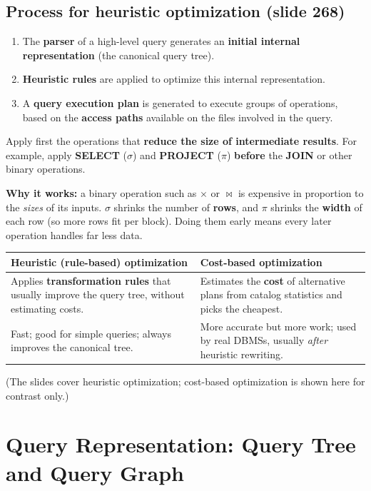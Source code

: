 \documentclass[10pt,a4paper]{article}
\begin{document}
\subsection{Process for heuristic optimization (slide 268)}
\begin{enumerate}
  \item The \textbf{parser} of a high-level query generates an \textbf{initial internal representation} (the canonical query tree).
  \item \textbf{Heuristic rules} are applied to optimize this internal representation.
  \item A \textbf{query execution plan} is generated to execute groups of operations, based on the \textbf{access paths} available on the files involved in the query.
\end{enumerate}

\begin{keybox}
Apply first the operations that \textbf{reduce the size of intermediate results}. For example, apply \textbf{SELECT} ($\sigma$) and \textbf{PROJECT} ($\pi$) \textbf{before} the \textbf{JOIN} or other binary operations.
\end{keybox}

\textbf{Why it works:} a binary operation such as $\times$ or $\bowtie$ is expensive in proportion to the \emph{sizes} of its inputs. $\sigma$ shrinks the number of \textbf{rows}, and $\pi$ shrinks the \textbf{width} of each row (so more rows fit per block). Doing them early means every later operation handles far less data.

\begin{tabularx}{\linewidth}{@{}X X@{}}
\toprule
\textbf{Heuristic (rule-based) optimization} & \textbf{Cost-based optimization}\\\midrule
Applies \textbf{transformation rules} that usually improve the query tree, without estimating costs. & Estimates the \textbf{cost} of alternative plans from catalog statistics and picks the cheapest.\\
Fast; good for simple queries; always improves the canonical tree. & More accurate but more work; used by real DBMSs, usually \emph{after} heuristic rewriting.\\
\bottomrule
\end{tabularx}
\smallskip
(The slides cover heuristic optimization; cost-based optimization is shown here for contrast only.)

\section{Query Representation: Query Tree and Query Graph}
\end{document}
